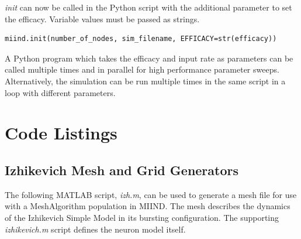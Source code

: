 \documentclass[utf8]{frontiers_suppmat} %
\begin{document}
\textit{init} can now be called in the Python script with the additional parameter to set the efficacy. Variable values must be passed as strings.

\begin{lstlisting}
miind.init(number_of_nodes, sim_filename, EFFICACY=str(efficacy))
\end{lstlisting}

A Python program which takes the efficacy and input rate as parameters can be called multiple times and in parallel for high performance parameter sweeps. Alternatively, the simulation can be run multiple times in the same script in a loop with different parameters.

\section{Code Listings}

\subsection{Izhikevich Mesh and Grid Generators}
\label{izhmesh}
The following MATLAB script, \textit{izh.m}, can be used to generate a mesh file for use with a MeshAlgorithm population in MIIND. The mesh describes the dynamics of the Izhikevich Simple Model \citep{izhikevich2003simple} in its bursting configuration. The supporting \textit{izhikevich.m} script defines the neuron model itself. \\
\end{document}
